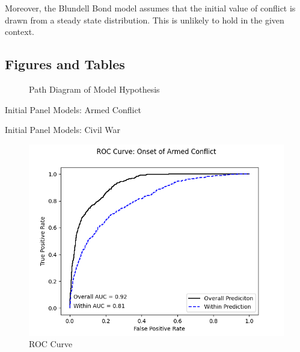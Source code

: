 Moreover, the Blundell Bond model assumes that the initial value of conflict is drawn from a steady state distribution.
This is unlikely to hold in the given context.


\newpage

\begin{appendix}
    \section{Figures and Tables}
    

    \clearpage
    \newpage

    \begin{figure}[!h]
        \caption{Path Diagram of Model Hypothesis}
        \centering
        
        \label{path}
    \end{figure}

    \clearpage
    \newpage

    \begin{table}[!h]
        \caption{Initial Panel Models: Armed Conflict}
        \centering
        
        \label{tab::armed}
    \end{table}

    \begin{table}[!h]
        \caption{Initial Panel Models: Civil War}
        \centering
        
        \label{tab::civil}
    \end{table}

    \begin{figure}[!h]
        \centering
        \includegraphics{ROC_FE.png}
        \caption{ROC Curve}
        \label{rocfe}
    \end{figure}


\end{appendix}
